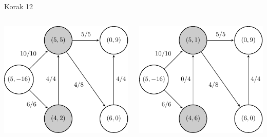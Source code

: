\documentclass{beamer}
\begin{document}
\begin{frame}{Korak 12}
    \begin{columns}
        \begin{column}{0.5\textwidth}
            \centering
            \includegraphics[scale=0.7]{../writing/images/graf2-13.pdf}
        \end{column}

        \begin{column}{0.5\textwidth}
            \centering
            \includegraphics[scale=0.7]{../writing/images/graf2-14.pdf}
        \end{column}
    \end{columns}
\end{frame}
\end{document}
